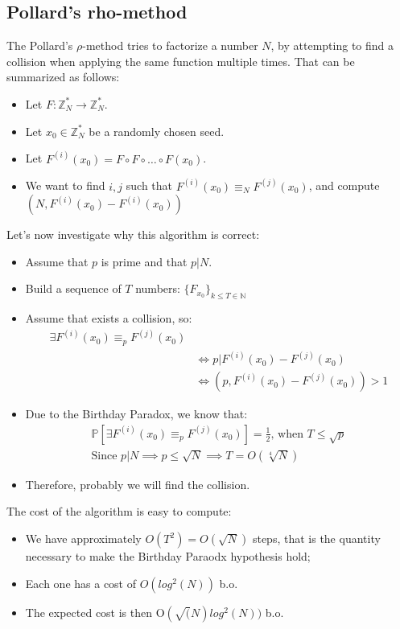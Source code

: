 \subsection{Pollard's rho-method}
The Pollard's $\rho$-method tries to factorize a number $N$, by attempting to find a collision when applying the same function multiple times. That can be summarized as follows:
\begin{itemize}
    \item Let $F: \mathbb{Z}_{N}^{*} \rightarrow \mathbb{Z}_{N}^{*}$.
    \item Let $x_{0} \in \mathbb{Z}_{N}^{*}$ be a randomly chosen seed.
    \item Let $F^{(i)}(x_{0}) = F \circ F \circ \dots \circ F(x_{0})$.
    \item We want to find $i,j$ such that $F^{(i)}(x_{0}) \equiv_{N} F^{(j)}(x_{0})$, and compute $(N, F^{(i)}(x_{0}) - F^{(i)}(x_{0}))$
\end{itemize}
Let's now investigate why this algorithm is correct:
\begin{itemize}
    \item Assume that $p$ is prime and that $p|N$.
    \item Build a sequence of $T$ numbers: $\{F_{x_{0}}\}_{k \leq T \in \mathbb{N}}$
    \item Assume that exists a collision, so:
    \begin{align*}
        \exists F^{(i)}(x_{0}) \equiv_{p} F^{(j)}(x_{0}) & \\
        & \iff p | F^{(i)}(x_{0}) - F^{(j)}(x_{0}) \\
        & \iff (p, F^{(i)}(x_{0}) - F^{(j)}(x_{0})) > 1
    \end{align*}
    \item Due to the Birthday Paradox, we know that:
    \begin{align*}
        \mathbb{P}[\exists F^{(i)}(x_{0}) \equiv_{p} F^{(j)}(x_{0})] = \frac{1}{2} \text{, when } T \leq \sqrt{p} \\
        \text{Since } p|N \implies p \leq \sqrt{N} \implies T = O(\sqrt[4]{N})
    \end{align*}
    \item Therefore, probably we will find the collision.
\end{itemize}
The cost of the algorithm is easy to compute:
\begin{itemize}
    \item We have approximately $O(T^{2}) = O(\sqrt{N})$ steps, that is the quantity necessary to make the Birthday Paraodx hypothesis hold;
    \item Each one has a cost of $O(log^{2}(N))$ b.o.
    \item The expected cost is then O$(\sqrt(N) log^{2}(N))$ b.o.
\end{itemize}

